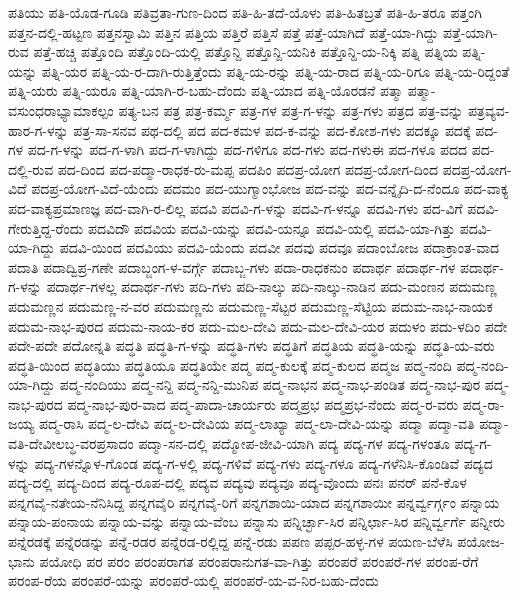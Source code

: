 ಪತಿಯು
ಪತಿ-ಯೊಡ-ಗೂಡಿ
ಪತಿವ್ರತಾ-ಗುಣ-ದಿಂದ
ಪತಿ-ಹಿ-ತದೆ-ಯೊಳು
ಪತಿ-ಹಿತಬ್ರತೆ
ಪತಿ-ಹಿ-ತರೂ
ಪತ್ತಂಗಿ
ಪತ್ತನ-ದಲ್ಲಿ-ಹಟ್ಟಣ
ಪತ್ತನಸ್ವಾಮಿ
ಪತ್ತಿನ
ಪತ್ತಿಯ
ಪತ್ತಿರೆ
ಪತ್ತಿಸೆ
ಪತ್ತೆ
ಪತ್ತೆ-ಯಾಗಿದೆ
ಪತ್ತೆ-ಯಾ-ಗಿದ್ದು
ಪತ್ತೆ-ಯಾಗಿ-ರುವ
ಪತ್ತೆ-ಹಚ್ಚಿ
ಪತ್ತೊಂದಿ
ಪತ್ತೊಂದಿ-ಯಲ್ಲಿ
ಪತ್ತೊನ್ದಿ
ಪತ್ತೊನ್ದಿ-ಯನಿಕಿ
ಪತ್ತೊನ್ದಿ-ಯ-ನಿಕ್ಕಿ
ಪತ್ನಿ
ಪತ್ನಿಯ
ಪತ್ನಿ-ಯನ್ನು
ಪತ್ನಿ-ಯರ
ಪತ್ನಿ-ಯ-ರ-ದಾಗಿ-ರುತ್ತಿತ್ತೆಂದು
ಪತ್ನಿ-ಯ-ರನ್ನು
ಪತ್ನಿ-ಯ-ರಾದ
ಪತ್ನಿ-ಯ-ರಿಗೂ
ಪತ್ನಿ-ಯ-ರಿದ್ದಂತೆ
ಪತ್ನಿ-ಯರು
ಪತ್ನಿ-ಯರೂ
ಪತ್ನಿ-ಯಾಗಿ-ರ-ಬಹು-ದೆಂದು
ಪತ್ನಿ-ಯಾದ
ಪತ್ನಿ-ಯೊರಡನೆ
ಪತ್ಮಾ
ಪತ್ಮಾ-ವಸುಂಧರಾಭ್ಯಾಮಾಕಲ್ಪಂ
ಪತ್ಯ-ಬನ
ಪತ್ರ
ಪತ್ರ-ಕರ್ಮ್ಮ
ಪತ್ರ-ಗಳ
ಪತ್ರ-ಗ-ಳನ್ನು
ಪತ್ರ-ಗಳು
ಪತ್ರದ
ಪತ್ರ-ವನ್ನು
ಪತ್ರವ್ಯವ-ಹಾರ-ಗ-ಳನ್ನು
ಪತ್ರ-ಸಾ-ಸನವ
ಪಥ-ದಲ್ಲಿ
ಪದ
ಪದ-ಕಮಳ
ಪದ-ಕ-ವನ್ನು
ಪದ-ಕೋಶ-ಗಳು
ಪದಕ್ಕೂ
ಪದಕ್ಕೆ
ಪದ-ಗಳ
ಪದ-ಗ-ಳನ್ನು
ಪದ-ಗ-ಳಾಗಿ
ಪದ-ಗ-ಳಾಗಿದ್ದು
ಪದ-ಗಳಿಗೂ
ಪದ-ಗಳು
ಪದ-ಗಳುಈ
ಪದ-ಗಳೂ
ಪದದ
ಪದ-ದಲ್ಲಿ-ರುವ
ಪದ-ದಿಂದ
ಪದ-ಪದ್ಮಾ-ರಾಧಕ-ರು-ಮಪ್ಪ
ಪದಪಿಂ
ಪದಪ್ರ-ಯೋಗ
ಪದಪ್ರ-ಯೋಗ-ದಿಂದ
ಪದಪ್ರ-ಯೋಗ-ವಿದೆ
ಪದಪ್ರ-ಯೋಗ-ವಿದೆ-ಯೆಂದು
ಪದಮಂ
ಪದ-ಯುಗ್ಮಾಂಭೋಜ
ಪದ-ವನ್ನು
ಪದ-ವನ್ನೈದಿ-ದ-ನೆಂದೂ
ಪದ-ವಾಕ್ಯ
ಪದ-ವಾಕ್ಯಪ್ರಮಾಣಜ್ಞ
ಪದ-ವಾಗಿ-ರ-ಲಿಲ್ಲ
ಪದವಿ
ಪದವಿ-ಗ-ಳನ್ನು
ಪದವಿ-ಗ-ಳನ್ನೂ
ಪದವಿ-ಗಳು
ಪದ-ವಿಗೆ
ಪದವಿ-ಗೇರುತ್ತಿದ್ದ-ರೆಂದು
ಪದವಿದೌ
ಪದವಿಯ
ಪದವಿ-ಯನ್ನು
ಪದವಿ-ಯನ್ನೂ
ಪದವಿ-ಯಲ್ಲಿ
ಪದವಿ-ಯಾ-ಗಿತ್ತು
ಪದವಿ-ಯಾ-ಗಿದ್ದು
ಪದವಿ-ಯಿಂದ
ಪದವಿಯು
ಪದವಿ-ಯೆಂದು
ಪದವೀ
ಪದವು
ಪದವೂ
ಪದಾಂಬೋಜ
ಪದಾಕ್ರಾಂತ-ವಾದ
ಪದಾತಿ
ಪದಾದ್ವಿಪ್ರ-ಗಣೇ
ಪದಾಬ್ಜಂಗ-ಳ-ವರ್ಗ್ಗೆ
ಪದಾಬ್ಜ-ಗಳು
ಪದಾ-ರಾಧಕನುಂ
ಪದಾರ್ಥ
ಪದಾರ್ಥ-ಗಳ
ಪದಾರ್ಥ-ಗ-ಳನ್ನು
ಪದಾರ್ಥ-ಗಳಲ್ಲ
ಪದಾರ್ಥ-ಗಳು
ಪದಿ-ಗಳು
ಪದಿ-ನಾಲ್ಕು
ಪದಿ-ನಾಲ್ಕು-ನಾಡಿನ
ಪದು-ಮಂಣನ
ಪದುಮಣ್ಣ
ಪದುಮಣ್ಣನ
ಪದುಮಣ್ಣ-ನ-ವರ
ಪದುಮಣ್ಣನು
ಪದುಮಣ್ಣ-ಸೆಟ್ಟರ
ಪದುಮಣ್ಣ-ಸೆಟ್ಟಿಯ
ಪದುಮ-ನಾಭ-ನಾಯಕ
ಪದುಮ-ನಾಭ-ಪುರದ
ಪದುಮ-ನಾಯ-ಕರ
ಪದು-ಮಲ-ದೇವಿ
ಪದು-ಮಲ-ದೇವಿ-ಯರ
ಪದುಳಂ
ಪದು-ಳದಿಂ
ಪದೇ
ಪದೇ-ಪದೇ
ಪದೋನ್ನತಿ
ಪದ್ಧತಿ
ಪದ್ಧತಿ-ಗ-ಳನ್ನು
ಪದ್ಧತಿ-ಗಳು
ಪದ್ಧತಿಗೆ
ಪದ್ಧತಿಯ
ಪದ್ಧತಿ-ಯನ್ನು
ಪದ್ಧತಿ-ಯ-ವರು
ಪದ್ಧತಿ-ಯಿಂದ
ಪದ್ಧತಿಯು
ಪದ್ಧತಿಯೂ
ಪದ್ಧತಿಯೇ
ಪದ್ಮ
ಪದ್ಮ-ಕುಲಕ್ಕೆ
ಪದ್ಮ-ಕುಲದ
ಪದ್ಮಜ
ಪದ್ಮ-ನಂದಿ
ಪದ್ಮ-ನಂದಿ-ಯಾ-ಗಿದ್ದು
ಪದ್ಮ-ನಂದಿಯು
ಪದ್ಮ-ನನ್ದಿ
ಪದ್ಮ-ನನ್ದಿ-ಮುನಿಪ
ಪದ್ಮ-ನಾಭನ
ಪದ್ಮ-ನಾಭ-ಪಂಡಿತ
ಪದ್ಮ-ನಾಭ-ಪುರ
ಪದ್ಮ-ನಾಭ-ಪುರದ
ಪದ್ಮ-ನಾಭ-ಪುರ-ವಾದ
ಪದ್ಮ-ಪಾದಾ-ಚಾರ್ಯರು
ಪದ್ಮಪ್ರಭ
ಪದ್ಮಪ್ರಭ-ನೆಂದು
ಪದ್ಮ-ರ-ವರು
ಪದ್ಮ-ರಾ-ಜಯ್ಯ
ಪದ್ಮ-ರಾಸಿ
ಪದ್ಮ-ಲ-ದೇವಿ
ಪದ್ಮ-ಲ-ದೇವಿಯ
ಪದ್ಮ-ಲಾಖ್ಯಾ
ಪದ್ಮ-ಲಾ-ದೇವಿ-ಯನ್ನು
ಪದ್ಮಾ
ಪದ್ಮಾ-ವತಿ
ಪದ್ಮಾ-ವತಿ-ದೇವೀಲಬ್ಧ-ವರಪ್ರಸಾದಂ
ಪದ್ಮಾ-ಸನ-ದಲ್ಲಿ
ಪದ್ಮೋಪ-ಜೀವಿ-ಯಾಗಿ
ಪದ್ಯ
ಪದ್ಯ-ಗಳ
ಪದ್ಯ-ಗಳಂತೂ
ಪದ್ಯ-ಗ-ಳನ್ನು
ಪದ್ಯ-ಗಳನ್ನೊಳ-ಗೊಂಡ
ಪದ್ಯ-ಗ-ಳಲ್ಲಿ
ಪದ್ಯ-ಗಳಿವೆ
ಪದ್ಯ-ಗಳು
ಪದ್ಯ-ಗಳೂ
ಪದ್ಯ-ಗಳೆನಿಸಿ-ಕೊಂಡಿವೆ
ಪದ್ಯದ
ಪದ್ಯ-ದಲ್ಲಿ
ಪದ್ಯ-ದಿಂದ
ಪದ್ಯ-ರೂಪ-ದಲ್ಲಿ
ಪದ್ಯವ
ಪದ್ಯವು
ಪದ್ಯವೂ
ಪದ್ಯ-ವೊಂದು
ಪನಃ
ಪನರ್
ಪನೆ-ಕೊಳ
ಪನ್ನಗವೈ-ನತೇಯ-ನೆನಿಸಿದ್ದ
ಪನ್ನಗವೈರಿ
ಪನ್ನಗವೈ-ರಿಗೆ
ಪನ್ನಗಶಾಯಿ-ಯಾದ
ಪನ್ನಗಶಾಯೀ
ಪನ್ನರ್ವ್ವರ್ಗ್ಗಂ
ಪನ್ನಾಯ
ಪನ್ನಾಯ-ಪಂನಾಯ
ಪನ್ನಾಯ-ವನ್ನು
ಪನ್ನಾಯ-ವೆಂಬ
ಪನ್ನಾಸು
ಪನ್ನಿರ್ಚ್ಛಾ-ಸಿರ
ಪನ್ನಿರ್ಛಾ-ಸಿರ
ಪನ್ನಿರ್ವ್ವರ್ಗೆ
ಪನ್ನೀರು
ಪನ್ನೆರಡಕ್ಕೆ
ಪನ್ನೆರಡನ್ನು
ಪನ್ನೆ-ರಡರ
ಪನ್ನೆರಡ-ರಲ್ಲಿದ್ದ
ಪನ್ನೆ-ರಡು
ಪಪಣ
ಪಪ್ಪರ-ಹಳ್ಳ-ಗಳ
ಪಯಣ-ಬೆಳೆಸಿ
ಪಯೋಜ-ಭಾನು
ಪಯೋಧಿ
ಪರ
ಪರಂ
ಪರಂಪರಾಗತ
ಪರಂಪರಾನುಗತ-ವಾ-ಗಿತ್ತು
ಪರಂಪರೆ
ಪರಂಪರೆ-ಗಳ
ಪರಂಪ-ರೆಗೆ
ಪರಂಪ-ರೆಯ
ಪರಂಪರೆ-ಯನ್ನು
ಪರಂಪರೆ-ಯಲ್ಲಿ
ಪರಂಪರೆ-ಯ-ವ-ನಿರ-ಬಹು-ದೆಂದು
